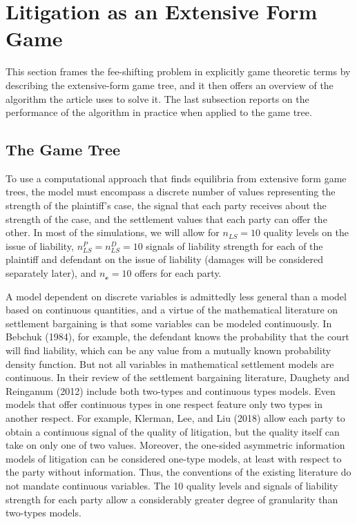 \documentclass{article}
\begin{document}
\section{Litigation as an Extensive Form Game}

This section frames the fee-shifting problem in explicitly game theoretic terms by describing the extensive-form game tree, and it then offers an overview of the algorithm the article uses to solve it. The last subsection reports on the performance of the algorithm in practice when applied to the game tree. 

\subsection{The Game Tree} \label{gametree}



To use a computational approach that finds equilibria from extensive form game trees, the model must encompass a discrete number of values representing the strength of the plaintiff's case, the signal that each party receives about the strength of the case, and the settlement values that each party can offer the other. In most of the simulations, we will allow for $n_{LS}=10$ quality levels on the issue of liability, $n_{LS}^P=n_{LS}^D=10$ signals of liability strength for each of the plaintiff and defendant on the issue of liability (damages will be considered separately later), and  $n_{\mathcal{o}}=10$ offers for each party. 

A model dependent on discrete variables is admittedly less general than a model based on continuous quantities, and a virtue of the mathematical literature on settlement bargaining is that some variables can be modeled continuously. In Bebchuk (1984), for example, the defendant knows the probability that the court will find liability, which can be any value from a mutually known probability density function. But not all variables in mathematical settlement models are continuous. In their review of the settlement bargaining literature, Daughety and Reinganum (2012) \cite{daughetyreinganum2012} include both two-types and continuous types models. Even models that offer continuous types in one respect feature only two types in another respect. For example, Klerman, Lee, and Liu (2018) \cite{klermanleeliu} allow each party to obtain a continuous signal of the quality of litigation, but the quality itself can take on only one of two values. Moreover, the one-sided asymmetric information models of litigation can be considered one-type models, at least with respect to the party without information.  Thus, the conventions of the existing literature do not mandate continuous variables. The 10 quality levels and signals of liability strength for each party allow a considerably greater degree of granularity than two-types models. 
\end{document}

